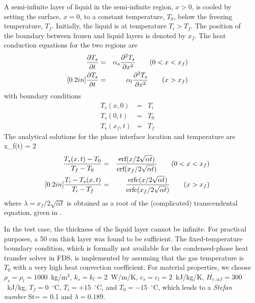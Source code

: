 \documentclass[11pt]{book}
\begin{document}
A semi-infinite layer of liquid in the semi-infinite region, $x>0$,
is cooled by setting the surface, $x=0$, to a constant temperature, $T_0$,
below the freezing temperature, $T_f$. Initially, the liquid is at temperature $T_i > T_f$. The position of the boundary between frozen and liquid layers
is denoted by $x_f$. The heat conduction equations for the two regions are
\begin{eqnarray}
\frac{\partial T_s}{\partial t} & = & \alpha_s \frac{\partial^2 T_s}{\partial x^2} \quad \quad (0 < x < x_f) \\ [0.2in]
\frac{\partial T_s}{\partial t} & = & \alpha_l \frac{\partial^2 T_s}{\partial x^2} \quad \quad (x > x_f)
\end{eqnarray}
with boundary conditions
\begin{eqnarray}
T_s(x,0)   &= & T_i \nonumber \\
T_s(0,t)   &= & T_0 \nonumber \\
T_s(x_f,t) &= & T_f \nonumber
\end{eqnarray}
The analytical solutions for the phase interface location and temperature are \cite{Carslaw:1}
\be
x_f(t) = 2 \lambda {}
\ee
\begin{eqnarray}
\frac{T_s(x,t)-T_0}{T_f - T_0} &=& \frac{\hbox{erf}(x/2\sqrt{\alpha t})} {\hbox{erf} (x_f/2\sqrt{\alpha t})} \quad \quad (0 < x < x_f) \\ [0.2in]
\frac{T_i-T_s(x,t)}{T_i - T_f} &=& \frac{\hbox{erfc}(x/2\sqrt{\alpha t})}{\hbox{erfc}(x_f/2\sqrt{\alpha t})} \quad \quad (x > x_f)
\end{eqnarray}
where $\lambda = x_f /2\sqrt{\alpha t}$ is obtained as a root of the (complicated)
transcendental equation, given in \cite{Carslaw:1}.

In the test case, the thickness of the liquid layer cannot be infinite. For practical purposes, a 50 cm thick layer was found to be sufficient.
The fixed-temperature boundary condition, which is formally not available for the condensed-phase heat transfer solver in FDS,
is implemented by assuming that the gas temperature is $T_0$ with a very high heat convection coefficient.
For material properties, we choose $\rho_s = \rho_l =1000$~kg/m$^3$,
$k_s = k_l = 2$~W/m/K, $c_s = c_l = 2$~kJ/kg/K, $H_{r,\alpha\beta}=300$~kJ/kg, $T_f = 0$~$^\circ$C, $T_i = +15$~$^\circ$C,
and $T_0 = -15$~$^\circ$C, which leads to a {\em Stefan number}
\be
\hbox{St}= = 0.1
\ee
and $\lambda = 0.189$.
\end{document}
